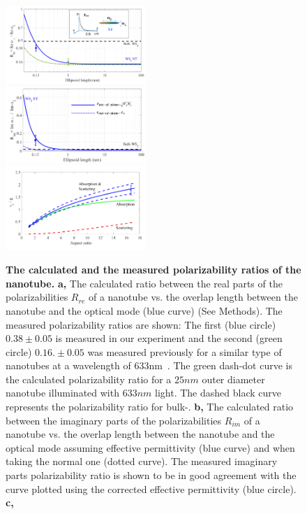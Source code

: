 \documentclass[journal=jacsat,manuscript=article]{achemso}
\begin{document}
\begin{figure}[H]
\centering
   \includegraphics[width=0.475\textwidth]{Images/Rre_semilog_NT91A.png}\\
   \includegraphics[width=0.475\textwidth]{Images/Rim_semilog_NT6_a1.png}\\
   \includegraphics[width=0.475\textwidth]{Images/R_re_im_with_scattering.png}
   \caption{\textbf{The calculated and the measured polarizability ratios of the  nanotube.} \textbf{a,} The calculated ratio between the real parts of the polarizabilities $R_{re}$ of a  nanotube vs. the overlap length between the nanotube and the optical mode (blue curve) (See Methods). The measured polarizability ratios are shown: The first (blue circle) $0.38 \pm 0.05$ is measured in our experiment and the second (green circle) $0.16.\pm0.05$ was measured previously for a similar type of nanotubes at a wavelength of 633nm~\cite{tenne2005orientation}. The green dash-dot curve is the calculated polarizability ratio for a $25nm$ outer diameter nanotube illuminated with $633nm$ light. The dashed black curve represents the polarizability ratio for bulk-. \textbf{b,} The calculated ratio between the imaginary parts of the polarizabilities $R_{im}$ of a  nanotube vs. the overlap length between the nanotube and the optical mode assuming effective permittivity (blue curve) and when taking the normal one (dotted curve). The measured imaginary parts polarizability ratio is shown to be in good agreement with the curve plotted using the corrected effective permittivity (blue circle). \textbf{c,}}
\label{fig:pol_ratios}
\end{figure}
\end{document}

